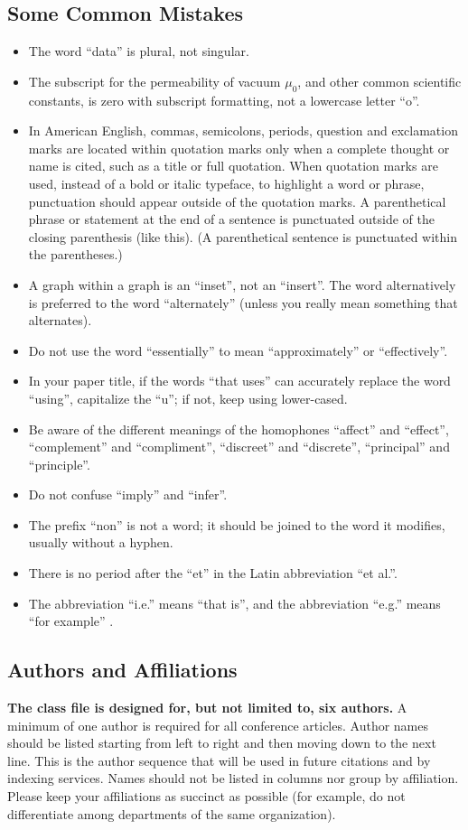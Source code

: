 \documentclass[conference]{IEEEtran}
\begin{document}
\subsection{Some Common Mistakes}\label{SCM}
\begin{itemize}
\item The word ``data'' is plural, not singular.
\item The subscript for the permeability of vacuum $\mu_{0}$, and other common scientific constants, is zero with subscript formatting, not a lowercase letter ``o''.
\item In American English, commas, semicolons, periods, question and exclamation marks are located within quotation marks only when a complete thought or name is cited, such as a title or full quotation. When quotation marks are used, instead of a bold or italic typeface, to highlight a word or phrase, punctuation should appear outside of the quotation marks. A parenthetical phrase or statement at the end of a sentence is punctuated outside of the closing parenthesis (like this). (A parenthetical sentence is punctuated within the parentheses.)
\item A graph within a graph is an ``inset'', not an ``insert''. The word alternatively is preferred to the word ``alternately'' (unless you really mean something that alternates).
\item Do not use the word ``essentially'' to mean ``approximately'' or ``effectively''.
\item In your paper title, if the words ``that uses'' can accurately replace the word ``using'', capitalize the ``u''; if not, keep using lower-cased.
\item Be aware of the different meanings of the homophones ``affect'' and ``effect'', ``complement'' and ``compliment'', ``discreet'' and ``discrete'', ``principal'' and ``principle''.
\item Do not confuse ``imply'' and ``infer''.
\item The prefix ``non'' is not a word; it should be joined to the word it modifies, usually without a hyphen.
\item There is no period after the ``et'' in the Latin abbreviation ``et al.''.
\item The abbreviation ``i.e.'' means ``that is'', and the abbreviation ``e.g.'' means ``for example'' \cite{genius}.
\end{itemize}

\subsection{Authors and Affiliations}
\textbf{The class file is designed for, but not limited to, six authors.} A 
minimum of one author is required for all conference articles. Author names 
should be listed starting from left to right and then moving down to the 
next line. This is the author sequence that will be used in future citations 
and by indexing services. Names should not be listed in columns nor group by 
affiliation. Please keep your affiliations as succinct as possible (for 
example, do not differentiate among departments of the same organization).
\end{document}
